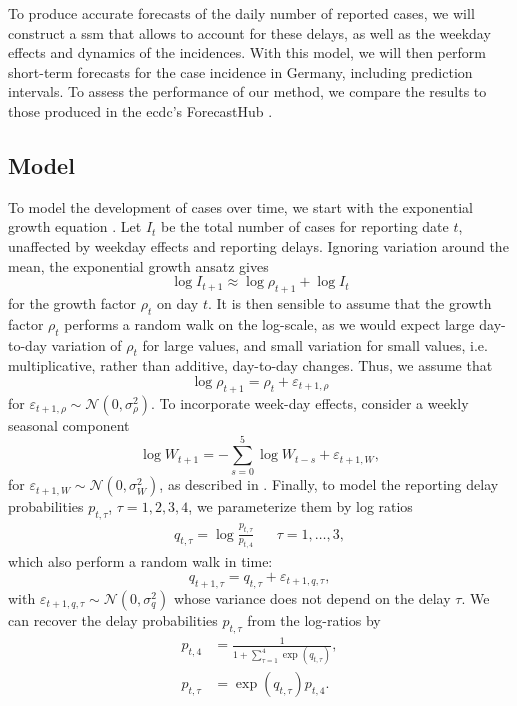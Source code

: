 To produce accurate forecasts of the daily number of reported cases, we will construct a \acrshort{ssm} that allows to account for these delays, as well as the weekday effects and dynamics of the incidences. With this model, we will then perform short-term forecasts for the case incidence in Germany, including prediction intervals. To assess the performance of our method, we compare the results to those produced in the \acrfull{ecdc}'s ForecastHub \citep{Sherratt2022Predictive}.

\subsection{Model}

To model the development of cases over time, we start with the exponential growth equation . Let $I_{t}$ be the total number of cases for reporting date $t$, unaffected by weekday effects and reporting delays. Ignoring variation around the mean, the exponential growth ansatz gives 
$$
    \log I_{t + 1} \approx \log \rho_{t + 1}  + \log I_{t}
$$
for the growth factor $\rho_{t}$ on day $t$. It is then sensible to assume that the growth factor $\rho_{t}$ performs a random walk on the log-scale, as we would expect large day-to-day variation of $\rho_{t}$ for large values, and small variation for small values, i.e. multiplicative, rather than additive, day-to-day changes. Thus, we assume that 
$$
    \log \rho_{t + 1} = \rho_{t} + \varepsilon_{t + 1, \rho}
$$
for $\varepsilon_{t + 1,\rho} \sim \mathcal N(0, \sigma^{2}_\rho)$. To incorporate week-day effects, consider a weekly seasonal component 
$$
    \log W_{t + 1} = - \sum_{s = 0}^{5} \log W_{t - s} + \varepsilon_{t + 1, W},
$$
for $\varepsilon_{t + 1, W} \sim \mathcal N(0, \sigma^{2}_{W})$, as described in . Finally, to model the reporting delay probabilities $p_{t,\tau}$, $\tau = 1,2,3,4$, we parameterize them by log ratios
\begin{align*}
    q_{t, \tau} = \log \frac{p_{t,\tau}}{p_{t,4}} && \tau = 1,\dots, 3,
\end{align*}
which also perform a random walk in time: 
$$
    q_{t + 1, \tau} = q_{t, \tau} + \varepsilon_{t+1, q, \tau},
$$
with $\varepsilon_{t + 1, q, \tau} \sim \mathcal N(0, \sigma^{2}_{q})$ whose variance does not depend on the delay $\tau$. We can recover the delay probabilities $p_{t, \tau}$ from the log-ratios by 
\begin{align*}
    p_{t, 4} &= \frac{1}{1 + \sum_{\tau = 1}^4 \exp \left( q_{t,\tau} \right)}, \\
    p_{t, \tau} &= \exp\left( q_{t, \tau} \right) p_{t, 4}.
\end{align*}

